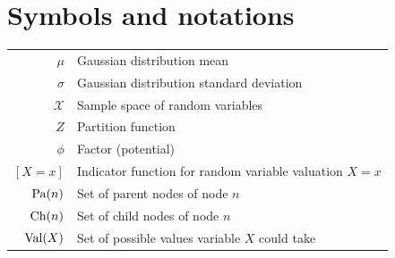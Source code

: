 {\let\cleardoublepage\relax{} \chapter*{Symbols and notations}}
\begin{tabular}{rl}
  $\mu$ & Gaussian distribution mean\\
  $\sigma$ & Gaussian distribution standard deviation\\
  $\mathcal{X}$ & Sample space of random variables\\
  $Z$ & Partition function\\
  $\phi$ & Factor (potential)\\
  $[X=x]$ & Indicator function for random variable valuation $X=x$\\
  $\operatorname*{\text{Pa}}(n)$ & Set of parent nodes of node $n$\\
  $\operatorname*{\text{Ch}}(n)$ & Set of child nodes of node $n$\\
  $\operatorname*{\text{Val}}(X)$ & Set of possible values variable $X$ could take\\
\end{tabular}

\listoffigures

{\let\cleardoublepage\relax{} \listoftables}

\listofalgorithms

\tableofcontents
